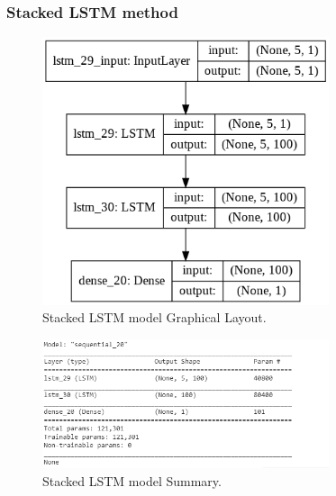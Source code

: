 \documentclass[12pt]{report}
\begin{document}
 
 

  \subsubsection{Stacked LSTM method}

\begin{figure}[H]%
\begin {center}
\includegraphics[width=0.75\textwidth]{StackedLstm.png}
\caption{Stacked LSTM model Graphical Layout.}
\label{fig:ecg}
\end {center}
\end{figure}

\begin{figure}[H]%
\begin {center}
\includegraphics[width=0.75\textwidth]{StackedLstm1.png}
\caption{Stacked LSTM model Summary.}
\label{fig:ecg}
\end {center}
\end{figure}
\end{document}
